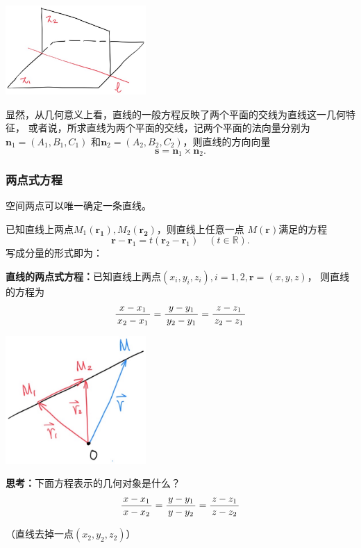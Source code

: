 \begin{center}
	\includegraphics[width=0.4\textwidth]{./images/ch8/p2l.jpg}
\end{center}

显然，从几何意义上看，直线的一般方程反映了两个平面的交线为直线这一几何特征，
或者说，所求直线为两个平面的交线，记两个平面的法向量分别为$\bm{n}_1=(A_1,B_1,C_1)$
和$\bm{n}_2=(A_2,B_2,C_2)$，则直线的方向向量
$$\bm{s}=\bm{n}_1\times\bm{n}_2.$$

\subsubsection{两点式方程}

空间两点可以唯一确定一条直线。

已知直线上两点$M_1(\bm{r_1}),M_2(\bm{r_2})$，则直线上任意一点
$M(\bm{r})$满足的方程
$${\bm{r}-\bm{r}_1=t(\bm{r}_2-\bm{r}_1)\quad (t\in\mathbb{R})}.$$ 
写成分量的形式即为：

\begin{thx}
	{\bf 直线的两点式方程：}已知直线上两点$(x_i,y_i,z_i),i=1,2,\bm{r}=(x,y,z)$，
	则直线的方程为
	$$\displaystyle\frac{\,{x-x_1}\,}{\,{x_2-x_1}\,}=\displaystyle\frac{\,{y-y_1}\,}{\,{y_2-y_1}\,}=\displaystyle\frac{\,{z-z_1}\,}{\,{z_2-z_1}\,}$$
\end{thx}

\begin{center}
	\includegraphics[width=0.4\textwidth]{./images/ch8/l2r.jpg}
\end{center}

{\bf 思考：}下面方程表示的几何对象是什么？
$${\displaystyle\frac{\,{x-x_1}\,}{\,{x-x_2}\,}=\displaystyle\frac{\,{y-y_1}\,}{\,{y-y_2}\,}=\displaystyle\frac{\,{z-z_1}\,}{\,{z-z_2}\,}}$$

\hfill （直线去掉一点$(x_2,y_2,z_2)$）

